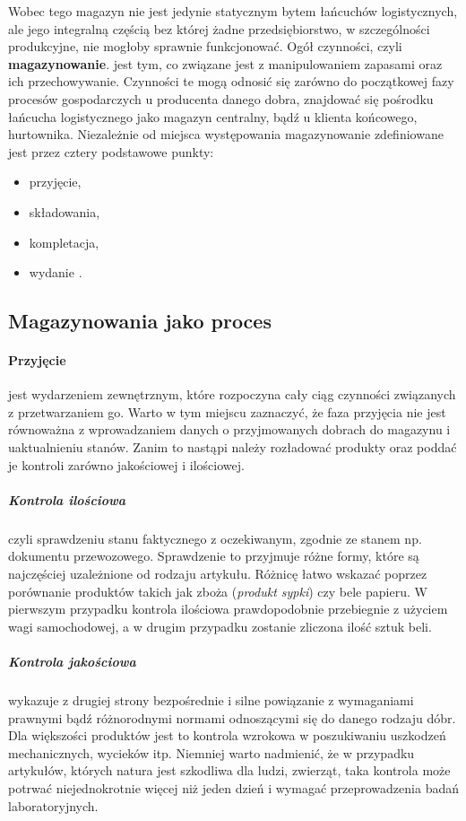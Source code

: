 	Wobec tego magazyn nie jest jedynie statycznym bytem łańcuchów logistycznych, ale jego integralną
	częścią bez której żadne przedsiębiorstwo, w szczególności produkcyjne, nie mogłoby sprawnie
	funkcjonować. Ogół czynności, czyli \textbf{magazynowanie}. jest tym, co związane jest z manipulowaniem
	zapasami oraz ich przechowywanie. Czynności te mogą odnosić się zarówno do początkowej fazy procesów gospodarczych
	u producenta danego dobra, znajdować się pośrodku łańcucha logistycznego jako magazyn centralny, bądź u klienta
	końcowego, hurtownika. Niezależnie od miejsca występowania magazynowanie zdefiniowane jest przez cztery
	podstawowe punkty: 
	\begin{itemize}
		\item przyjęcie,
		\item składowania,
		\item kompletacja,
		\item wydanie \cite{PZMW}\cite{PL_FM}.
	\end{itemize}
	
	\subsection{Magazynowania jako proces}
		\paragraph{Przyjęcie} jest wydarzeniem zewnętrznym, które rozpoczyna cały ciąg czynności związanych z przetwarzaniem go.
		Warto w tym miejscu zaznaczyć, że faza przyjęcia nie jest równoważna z wprowadzaniem danych o przyjmowanych
		dobrach do magazynu i uaktualnieniu stanów. Zanim to nastąpi należy rozładować produkty oraz poddać je kontroli
		zarówno jakościowej i ilościowej.
			\subparagraph{Kontrola ilościowa} czyli sprawdzeniu stanu faktycznego z oczekiwanym, zgodnie ze stanem np. dokumentu przewozowego. 
			Sprawdzenie to przyjmuje różne formy, które są najczęściej uzależnione od rodzaju artykułu. Różnicę łatwo wskazać
			poprzez porównanie produktów takich jak zboża (\textit{produkt sypki}) czy bele papieru. W pierwszym przypadku 
			kontrola ilościowa prawdopodobnie przebiegnie z użyciem wagi samochodowej, a w drugim przypadku zostanie zliczona
			ilość sztuk beli.  
			\subparagraph{Kontrola jakościowa} wykazuje z drugiej strony bezpośrednie i silne powiązanie z wymaganiami prawnymi bądź
			różnorodnymi normami odnoszącymi się do danego rodzaju dóbr. Dla większości produktów jest to kontrola
			wzrokowa w poszukiwaniu uszkodzeń mechanicznych, wycieków itp. Niemniej warto nadmienić, że w przypadku
			artykułów, których natura jest szkodliwa dla ludzi, zwierząt, taka kontrola może potrwać niejednokrotnie
			więcej niż jeden dzień i wymagać przeprowadzenia badań laboratoryjnych.
